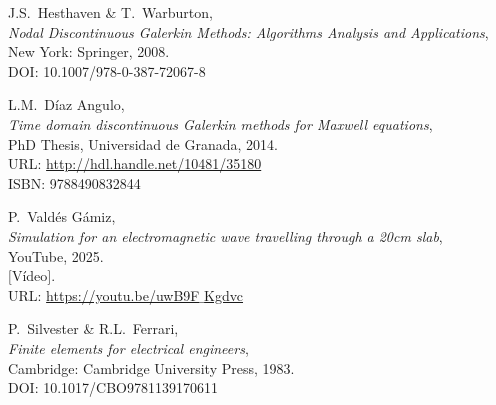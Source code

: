 \documentclass[11pt,a4paper,twoside,pdf]{article}
\numberwithin{equation}{section}
\begin{document}
\begin{thebibliography}{100}
  
  J.S.~Hesthaven \& T.~Warburton, \\
  {\em Nodal Discontinuous Galerkin Methods: Algorithms Analysis and Applications}, \\
  New York: Springer, 2008.\\
  DOI: 10.1007/978-0-387-72067-8
  


L.M.~Díaz Angulo, \\
  {\em Time domain discontinuous Galerkin methods for Maxwell equations},\\  
 PhD Thesis, Universidad de Granada, 2014.\\
 URL: \href{http://hdl.handle.net/10481/35180}{http://hdl.handle.net/10481/35180}\\
 ISBN: 9788490832844

P.~Valdés Gámiz, \\
 {\em Simulation for an electromagnetic wave travelling through a 20cm slab},\\  
 YouTube, 2025.\\ 
$[$Vídeo$]$.\\
 URL: \href{https://youtu.be/uwB9F_Kgdvc}{https://youtu.be/uwB9F$\_$Kgdvc}

  P.~Silvester \& R.L.~Ferrari, \\
  {\em Finite elements for
electrical engineers},\\  
  Cambridge: Cambridge University Press, 1983.\\
  DOI: 10.1017/CBO9781139170611

 





\end{thebibliography}
\end{document}
